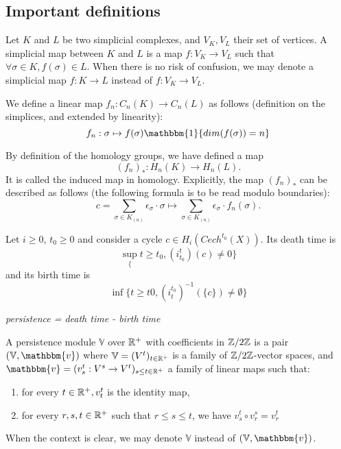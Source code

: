 \subsection{Important definitions}

\begin{definition}
    Let $K$ and $L$ be two simplicial complexes, and $V_K, V_L$ their set of 
    vertices. A simplicial map between $K$ and $L$ is a map $f : V_K \to V_L$ such that
    $\forall \sigma \in K, f(\sigma) \in L$. When there is no risk of
    confusion, we may denote a simplicial map $f : K \to L$ instead of $f :
    V_K \to V_L$.
    
    We define a linear map $f_n : C_n(K) \to C_n(L)$ as follows (definition on the simplices, and
    extended by linearity):
    $$
    f_n : \sigma \mapsto f(\sigma) \mathbbm{1}\{dim(f(\sigma)) = n\}
    $$
\end{definition}

\begin{definition}
    By definition of the homology groups, we have defined a map 
    $$(f_n)_* : H_n(K) \to H_n(L).$$ It is called the induced map in homology.
    Explicitly, the map $(f_n)_*$ can be described as follows (the following formula is to be
    read modulo boundaries):
    $$c = \sum_{\sigma \in K_{(n)}} \epsilon_{\sigma} \cdot \sigma \mapsto
    \sum_{\sigma \in K_{(n)}} \epsilon_{\sigma} \cdot f_n(\sigma).$$
\end{definition}

\begin{definition}
    Let $i \ge 0$, $t_0 \ge 0$ and consider a cycle $c \in
    H_i(Cech^{t_0}(X))$. Its death time is
    $$\sup_\{t \ge t_0, (i^t_{t_0}) (c) \neq 0\}$$
    and its birth time is
    $$\inf\{t \ge t0, (i^{t_0}_t)^{-1}(\{c\}) \neq \emptyset\}$$

    \begin{center}
        {\it persistence = death time - birth time}
    \end{center}
\end{definition}

\begin{definition}
    A persistence module $\mathbb{V}$ over $\mathbb{R}^+$ with coefficients in
    $\mathbb{Z}/2\mathbb{Z}$ is a pair $(\mathbb{V}, \mathbbm{v})$ where $\mathbb{V} = (V^t)_{t
    \in \mathbb{R}^+}$ is a family of $\mathbb{Z}/2\mathbb{Z}$-vector spaces, and $\mathbbm{v} = (v_s^t
    : V^s \to V^t)_{s \le t \in \R^+}$ a family of linear maps such that:
    \begin{enumerate}
        \item for every $t \in \mathbb{R}^+, v^t_t$ is the identity map,
        \item for every $r,s,t \in \mathbb{R}^+$ such that $r \le s \le t$, we have
        $v_s^t \circ v_r^s = v_r^t$
    \end{enumerate}
When the context is clear, we may denote $\mathbb{V}$ instead of $(\mathbb{V}, \mathbbm{v})$. 
\end{definition}

